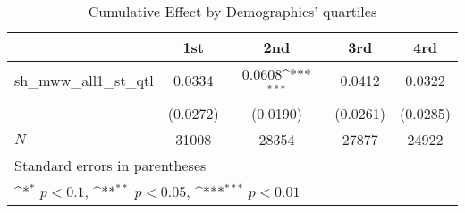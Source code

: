 \begin{table}[htbp]\centering
\def\sym#1{\ifmmode^{#1}\else\(^{#1}\)\fi}
\caption{Cumulative Effect by Demographics' quartiles}
\begin{tabular}{l*{4}{c}}
\hline\hline
            &\multicolumn{1}{c}{1st}&\multicolumn{1}{c}{2nd}&\multicolumn{1}{c}{3rd}&\multicolumn{1}{c}{4rd}\\
\hline
sh\_mww\_all1\_st\_qtl&      0.0334         &      0.0608\sym{***}&      0.0412         &      0.0322         \\
            &    (0.0272)         &    (0.0190)         &    (0.0261)         &    (0.0285)         \\
\hline
\(N\)       &       31008         &       28354         &       27877         &       24922         \\
\hline\hline
\multicolumn{5}{l}{\footnotesize Standard errors in parentheses}\\
\multicolumn{5}{l}{\footnotesize \sym{*} \(p<0.1\), \sym{**} \(p<0.05\), \sym{***} \(p<0.01\)}\\
\end{tabular}
\end{table}

